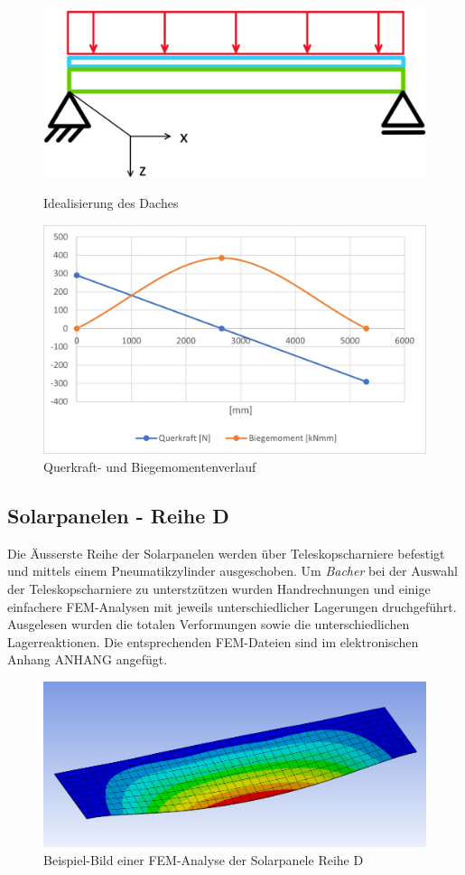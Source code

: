 \begin{figure}[h]
\centering
\begin{minipage}{.4\textwidth}
  \centering
  \includegraphics[width=.98\linewidth]{04_figures/Dach Idealisierung.png}
  \caption{Idealisierung des Daches}
  \label{Dach Idealisierung}
\end{minipage}%
\begin{minipage}{.6\textwidth}
  \centering
  \includegraphics[width=.98\linewidth]{04_figures/Dach QM.png}
  \caption{Querkraft- und Biegemomentenverlauf}
  \label{Dach QM}
\end{minipage}
\end{figure}


\subsection{Solarpanelen - Reihe D}
Die Äusserste Reihe der Solarpanelen werden über Teleskopscharniere befestigt und mittels einem Pneumatikzylinder ausgeschoben. Um \emph{Bacher} bei der Auswahl der Teleskopscharniere zu unterstzützen wurden Handrechnungen und einige einfachere FEM-Analysen mit jeweils unterschiedlicher Lagerungen druchgeführt. Ausgelesen wurden die totalen Verformungen sowie die unterschiedlichen Lagerreaktionen. Die entsprechenden FEM-Dateien sind im elektronischen Anhang ANHANG angefügt.

\begin{figure}[h]
  \centering
  \includegraphics[width=.6\linewidth]{04_figures/Panelen Verformung.png}
  \caption{Beispiel-Bild einer FEM-Analyse der Solarpanele Reihe D}
  \label{Panelen Verformung}
\end{figure}
\newpage
